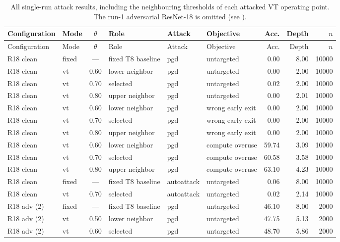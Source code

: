 {\footnotesize\setlength{\tabcolsep}{3pt}
\begin{longtable}{@{}l l c l l l r r r@{}}
\caption[All single-run attack results]{All single-run attack results, including the neighbouring thresholds of each attacked VT operating point. The run-1 adversarial ResNet-18 is omitted (see ).}\label{tab:app-attacks}\\
\toprule
Configuration & Mode & $\theta$ & Role & Attack & Objective & Acc. & Depth & $n$ \\
\midrule
\endfirsthead
\toprule
Configuration & Mode & $\theta$ & Role & Attack & Objective & Acc. & Depth & $n$ \\
\midrule
\endhead
R18 clean & fixed & --- & fixed T8 baseline & pgd & untargeted & 0.00 & 8.00 & 10000 \\
R18 clean & vt & 0.60 & lower neighbor & pgd & untargeted & 0.00 & 2.00 & 10000 \\
R18 clean & vt & 0.70 & selected & pgd & untargeted & 0.02 & 2.00 & 10000 \\
R18 clean & vt & 0.80 & upper neighbor & pgd & untargeted & 0.00 & 2.01 & 10000 \\
R18 clean & vt & 0.60 & lower neighbor & pgd & wrong early exit & 0.00 & 2.00 & 10000 \\
R18 clean & vt & 0.70 & selected & pgd & wrong early exit & 0.00 & 2.00 & 10000 \\
R18 clean & vt & 0.80 & upper neighbor & pgd & wrong early exit & 0.00 & 2.00 & 10000 \\
R18 clean & vt & 0.60 & lower neighbor & pgd & compute overuse & 59.74 & 3.09 & 10000 \\
R18 clean & vt & 0.70 & selected & pgd & compute overuse & 60.58 & 3.58 & 10000 \\
R18 clean & vt & 0.80 & upper neighbor & pgd & compute overuse & 63.10 & 4.23 & 10000 \\
R18 clean & fixed & --- & fixed T8 baseline & autoattack & untargeted & 0.06 & 8.00 & 10000 \\
R18 clean & vt & 0.70 & selected & autoattack & untargeted & 0.02 & 2.14 & 10000 \\
\addlinespace
R18 adv (2) & fixed & --- & fixed T8 baseline & pgd & untargeted & 46.10 & 8.00 & 2000 \\
R18 adv (2) & vt & 0.50 & lower neighbor & pgd & untargeted & 47.75 & 5.13 & 2000 \\
R18 adv (2) & vt & 0.60 & selected & pgd & untargeted & 48.70 & 5.86 & 2000 \\

\end{longtable}}
